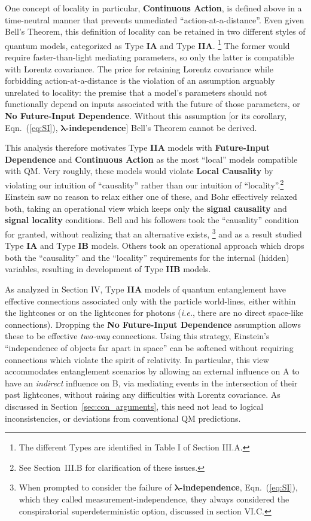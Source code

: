 \documentclass[rmp, aps, preprint, longbibliography]{revtex4-1}
\begin{document}
One concept of locality in particular, {\bf Continuous Action}, is defined above in a time-neutral manner that prevents unmediated ``action-at-a-distance''.  Even given Bell's Theorem, this definition of locality can be retained in two different styles of quantum models, categorized as Type {\bf IA} and Type {\bf IIA}.%
\footnote{The different Types are identified in Table I of Section III.A.}
The former would require faster-than-light mediating parameters, so only the latter is compatible with Lorentz covariance.  The price for retaining Lorentz covariance while forbidding action-at-a-distance is the violation of an assumption arguably unrelated to locality: the premise that a model's parameters should not functionally depend on inputs associated with the future of those parameters, or {\bf No Future-Input Dependence}.  Without this assumption [or its corollary, Eqn.~(\ref{eq:SI}), {\bf $\bm{\lambda}$-independence}] Bell's Theorem cannot be derived.  

This analysis therefore motivates Type {\bf IIA} models with {\bf Future-Input Dependence} and {\bf Continuous Action} as the most ``local'' models compatible with QM.  Very roughly, these models would violate {\bf Local Causality} by violating our intuition of ``causality'' rather than our intuition of ``locality''.\footnote{See Section~III.B for clarification of these issues.}  
Einstein saw no reason to relax either one of these, and Bohr effectively relaxed both, taking an operational view which keeps only the {\bf signal causality} and {\bf signal locality} conditions.  Bell and his followers took the ``causality'' condition for granted, without realizing that an alternative exists,%
\footnote{When prompted to consider the failure of {\bf $\bm{\lambda}$-independence}, Eqn.~(\ref{eq:SI}), which they called measurement-independence, they always considered the conspiratorial superdeterministic option, discussed in section VI.C.}
and as a result studied Type {\bf IA} and Type {\bf IB} models.  Others took an operational approach which drops both the ``causality'' and the ``locality'' requirements for the internal (hidden) variables, resulting in development of Type {\bf IIB} models.

As analyzed in Section IV, Type {\bf IIA} models of quantum entanglement have effective connections associated only with the particle world-lines, either within the lightcones or on the lightcones for photons (\emph{i.e.}, there are no direct space-like connections).  Dropping the {\bf No Future-Input Dependence} assumption allows these to be effective \emph{two-way} connections.  Using this strategy, Einstein's ``independence of objects far apart in space'' can be softened without requiring connections which violate the spirit of relativity.  In particular, this view accommodates entanglement scenarios by allowing an external influence on A to have an \emph{indirect} influence on B, via mediating events in the intersection of their past lightcones, without raising any difficulties with Lorentz covariance.  As discussed in Section~\ref{sec:con_arguments}, this need not lead to logical inconsistencies, or deviations from conventional QM predictions.
\end{document}
